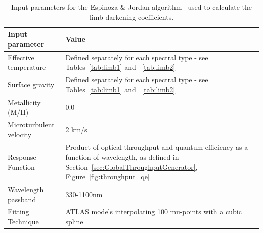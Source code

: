 \documentclass[11pt]{article}      %
\begin{document}
\begin{table}[hbtp]
  \begin{center}
  \caption{Input parameters for the Espinoza \& Jordan algorithm~\cite{limbDarkening_code} used to calculate the limb darkening coefficients.}
  \begin{tabular}{| l | p{13cm} |}
    \hline 
    Input parameter & Value\\
    \hline
Effective temperature & Defined separately for each spectral type - see Tables~\ref{tab:limb1} and ~\ref{tab:limb2}\\
Surface gravity & Defined separately for each spectral type - see Tables~\ref{tab:limb1} and ~\ref{tab:limb2}\\
Metallicity (M/H) & 0.0\\
Microturbulent velocity & 2 km/s\\
Response Function & Product of optical throughput and quantum efficiency as a function of wavelength, as defined in Section~\ref{sec:GlobalThroughputGenerator}, Figure~\ref{fig:throughput_qe}\\
Wavelength passband & 330-1100nm\\
Fitting Technique & ATLAS models interpolating 100 mu-points with a cubic spline~\cite{claret_bloeman}\\
    \hline
  \end{tabular}
  \label{tab:limb_inputs}
  \end{center}
\end{table}
\end{document}
